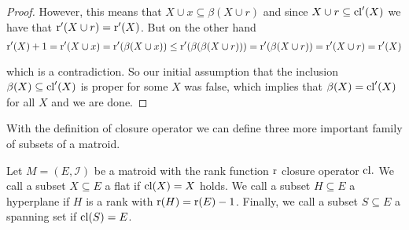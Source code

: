 \begin{proof}
However, this means that $X \cup x \subseteq \beta(X\cup r)$ and since $X\cup r \subseteq \mathrm{cl}'(X)$ we have that $\operatorname{r}'(X\cup r) = 
\operatorname{r}'(X)$. But on the other hand $$\operatorname{r}'(X) + 1= \operatorname{r}'(X\cup x) = \operatorname{r}'(\beta(X\cup x))\leq \operatorname{r}'(\beta(\beta(X\cup r))) = \operatorname{r}'(\beta(X\cup r)) = \operatorname{r}'(X\cup r) = \operatorname{r}'(X)$$

which is a contradiction. So our initial assumption that the inclusion $\beta(X) \subseteq \mathrm{cl}'(X)$ is proper for some $X$ was false, which implies that $\beta(X) = \mathrm{cl}'(X)$ for all $X$ and we are done.

\end{proof}


With the definition of closure operator we can define three more important family of subsets of a matroid.

\begin{defn}\label{HP&SS}
    Let $M = (E, \mathcal{I})$ be a matroid with the rank function $\operatorname{r}$ closure operator $\mathrm{cl}.$ We call a subset $X \subseteq E$ a flat if $\mathrm{cl}(X) = X$ holds. We call a subset $H \subseteq E$ a hyperplane if $H$ is a rank with $\operatorname{r}(H) = \operatorname{r}(E)-1$. Finally, we call a subset $S \subseteq E$ a spanning set if $\mathrm{cl}(S) = E$.
\end{defn}

